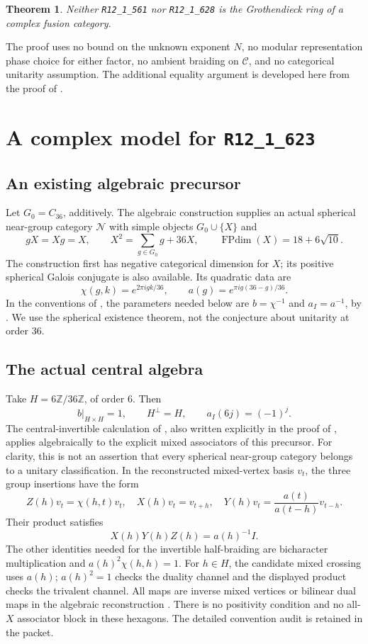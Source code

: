 \documentclass[11pt]{article}
\newtheorem{theorem}{Theorem}
\newcommand{\R}[1]{\texttt{R12\_1\_#1}}
\newcommand{\FPdim}{\operatorname{FPdim}}
\newcommand{\Z}{\mathbb Z}
\begin{document}
\begin{theorem}
Neither \R{561} nor \R{628} is the Grothendieck ring of a complex
fusion category.
\end{theorem}
The proof uses no bound on the unknown exponent $N$, no modular
representation phase choice for either factor, no ambient braiding on
$\mathcal C$, and no categorical unitarity assumption. The additional
equality argument is developed here from the proof of \cite{Sch26}.

\section{A complex model for \R{623}}
\subsection{An existing algebraic precursor}
Let $G_0=C_{36}$, additively. The algebraic construction
\cite[Theorems 2.3 and 2.10]{TPE} supplies an actual spherical near-group
category $\mathcal N$ with simple objects $G_0\cup\{X\}$ and
\[
 gX=Xg=X,\qquad X^2=\sum_{g\in G_0}g+36X,
 \qquad\FPdim(X)=18+6\sqrt{10}.
\]
The construction first has negative categorical dimension for $X$;
its positive spherical Galois conjugate is also available. Its quadratic
data are
\[
 \chi(g,k)=e^{2\pi i gk/36},\qquad
 a(g)=e^{\pi i g(36-g)/36}.
\]
In the conventions of \cite{Izumi}, the parameters needed below are
$b=\chi^{-1}$ and $a_I=a^{-1}$, by \cite[Lemma 2.14]{TPE}.
We use the spherical existence theorem, not the conjecture about
unitarity at order $36$.

\subsection{The actual central algebra}
Take $H=6\Z/36\Z$, of order $6$. Then
\[
 b|_{H\times H}=1,\qquad H^\perp=H,
 \qquad a_I(6j)=(-1)^j.
\]
The central-invertible calculation of \cite[Section 4.3]{EG}, also
written explicitly in the proof of \cite[Theorem 13.4]{Izumi}, applies
algebraically to the explicit mixed associators of this precursor.
For clarity, this is not an assertion that every spherical near-group
category belongs to a unitary classification. In the reconstructed
mixed-vertex basis $v_t$, the three group insertions have the form
\[
 Z(h)v_t=\chi(h,t)v_t,\quad X(h)v_t=v_{t+h},\quad
 Y(h)v_t=\frac{a(t)}{a(t-h)}v_{t-h}.
\]
Their product satisfies
\[
 X(h)Y(h)Z(h)=a(h)^{-1}I.
\]
The other identities needed for the invertible half-braiding are
bicharacter multiplication and $a(h)^2\chi(h,h)=1$.
For $h\in H$, the candidate mixed crossing uses $a(h)$;
$a(h)^2=1$ checks the duality channel and the displayed product checks
the trivalent channel. All maps are inverse mixed vertices or bilinear
dual maps in the algebraic reconstruction \cite[Section 4.7]{TPE}.
There is no positivity condition and no all-$X$ associator block in
these hexagons. The detailed convention audit is retained in the packet.
\end{document}
